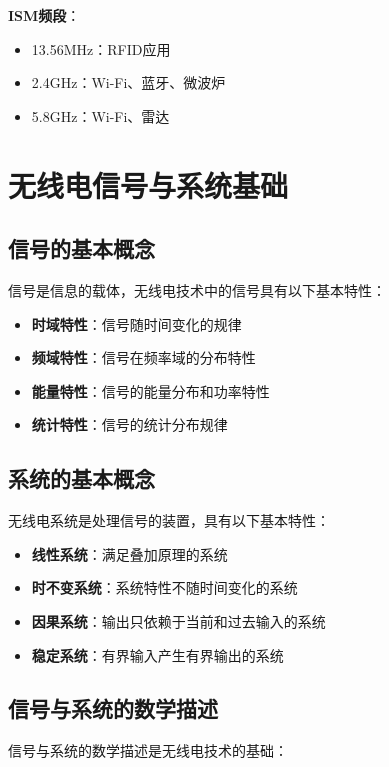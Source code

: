 \documentclass[12pt,UTF8]{ctexbook}
\begin{document}
\textbf{ISM频段}：
\begin{itemize}[leftmargin=3.5em]
    \item 13.56MHz：RFID应用
    \item 2.4GHz：Wi-Fi、蓝牙、微波炉
    \item 5.8GHz：Wi-Fi、雷达
\end{itemize}

\chapter{无线电信号与系统基础}

\section{信号的基本概念}

信号是信息的载体，无线电技术中的信号具有以下基本特性：

\begin{itemize}[leftmargin=3.5em]
    \item \textbf{时域特性}：信号随时间变化的规律
    \item \textbf{频域特性}：信号在频率域的分布特性
    \item \textbf{能量特性}：信号的能量分布和功率特性
    \item \textbf{统计特性}：信号的统计分布规律
\end{itemize}

\section{系统的基本概念}

无线电系统是处理信号的装置，具有以下基本特性：

\begin{itemize}[leftmargin=3.5em]
    \item \textbf{线性系统}：满足叠加原理的系统
    \item \textbf{时不变系统}：系统特性不随时间变化的系统
    \item \textbf{因果系统}：输出只依赖于当前和过去输入的系统
    \item \textbf{稳定系统}：有界输入产生有界输出的系统
\end{itemize}

\section{信号与系统的数学描述}

信号与系统的数学描述是无线电技术的基础：
\end{document}
